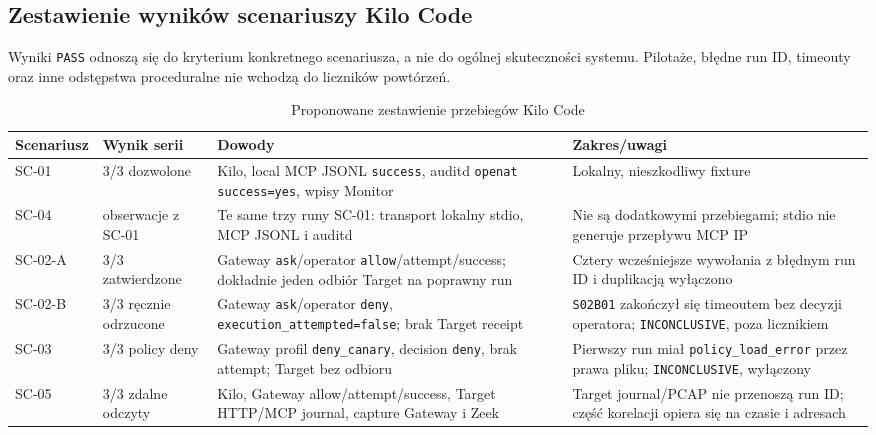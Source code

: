 
\subsection{Zestawienie wyników scenariuszy Kilo Code}
\label{subsec:wyniki-scenariuszy-kilo}

Wyniki \texttt{PASS} odnoszą się do kryterium konkretnego scenariusza, a nie
do ogólnej skuteczności systemu. Pilotaże, błędne run ID, timeouty oraz inne
odstępstwa proceduralne nie wchodzą do liczników powtórzeń.

\begin{table}[ht]
\centering
\small
\caption{Proponowane zestawienie przebiegów Kilo Code}
\label{tab:wyniki-kilo-scenariusze-propozycja}
\begin{tabular}{|p{}|p{}|p{}|p{}|}
\hline
\textbf{Scenariusz} & \textbf{Wynik serii} & \textbf{Dowody} & \textbf{Zakres/uwagi} \\
\hline
SC-01 & 3/3 dozwolone & Kilo, local MCP JSONL \texttt{success}, auditd \texttt{openat success=yes}, wpisy Monitor & Lokalny, nieszkodliwy fixture \\
\hline
SC-04 & obserwacje z SC-01 & Te same trzy runy SC-01: transport lokalny stdio, MCP JSONL i auditd & Nie są dodatkowymi przebiegami; stdio nie generuje przepływu MCP IP \\
\hline
SC-02-A & 3/3 zatwierdzone & Gateway \texttt{ask}/operator \texttt{allow}/attempt/success; dokładnie jeden odbiór Target na poprawny run & Cztery wcześniejsze wywołania z błędnym run ID i duplikacją wyłączono \\
\hline
SC-02-B & 3/3 ręcznie odrzucone & Gateway \texttt{ask}/operator \texttt{deny}, \texttt{execution\_attempted=false}; brak Target receipt & \texttt{S02B01} zakończył się timeoutem bez decyzji operatora; \texttt{INCONCLUSIVE}, poza licznikiem \\
\hline
SC-03 & 3/3 policy deny & Gateway profil \texttt{deny\_canary}, decision \texttt{deny}, brak attempt; Target bez odbioru & Pierwszy run miał \texttt{policy\_load\_error} przez prawa pliku; \texttt{INCONCLUSIVE}, wyłączony \\
\hline
SC-05 & 3/3 zdalne odczyty & Kilo, Gateway allow/attempt/success, Target HTTP/MCP journal, capture Gateway i Zeek & Target journal/PCAP nie przenoszą run ID; część korelacji opiera się na czasie i adresach \\

\end{tabular}
\end{table}
